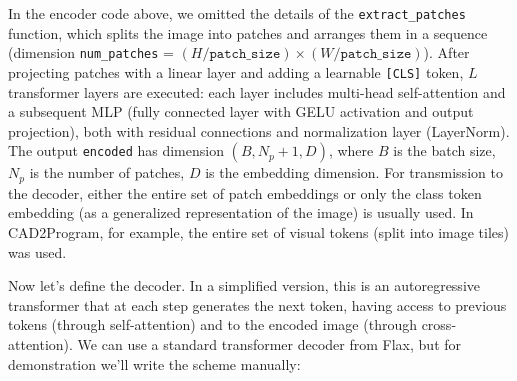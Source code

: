 \documentclass{article}
\begin{document}
In the encoder code above, we omitted the details of the \texttt{extract_patches} function, which splits the image into patches and arranges them in a sequence (dimension \texttt{num_patches} = $(H/\texttt{patch_size})\times(W/\texttt{patch_size})$). After projecting patches with a linear layer and adding a learnable \texttt{[CLS]} token, $L$ transformer layers are executed: each layer includes multi-head self-attention and a subsequent MLP (fully connected layer with GELU activation and output projection), both with residual connections and normalization layer (LayerNorm). The output \texttt{encoded} has dimension $(B, N_p+1, D)$, where $B$ is the batch size, $N_p$ is the number of patches, $D$ is the embedding dimension. For transmission to the decoder, either the entire set of patch embeddings or only the class token embedding (as a generalized representation of the image) is usually used. In CAD2Program, for example, the entire set of visual tokens (split into image tiles) was used.

Now let's define the decoder. In a simplified version, this is an autoregressive transformer that at each step generates the next token, having access to previous tokens (through self-attention) and to the encoded image (through cross-attention). We can use a standard transformer decoder from Flax, but for demonstration we'll write the scheme manually:
\end{document}
